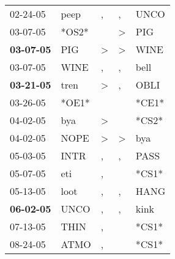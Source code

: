 \begin{supertabular}{p{0.07\textwidth}p{0.06\textwidth}p{0.02\textwidth}p{0.02\textwidth}p{0.06\textwidth}}
          02-24-05\textsuperscript{} &           peep\textsuperscript{} &                , &                , &           UNCO\textsuperscript{} \\
          03-07-05\textsuperscript{} &                            *OS2* &                  &     \textgreater &            PIG\textsuperscript{} \\
 \textbf{03-07-05\textsuperscript{}} &            PIG\textsuperscript{} &     \textgreater &     \textgreater &           WINE\textsuperscript{} \\
          03-07-05\textsuperscript{} &           WINE\textsuperscript{} &                , &                , &           bell\textsuperscript{} \\
 \textbf{03-21-05\textsuperscript{}} &           tren\textsuperscript{} &     \textgreater &                , &           OBLI\textsuperscript{} \\
          03-26-05\textsuperscript{} &                            *OE1* &                  &                  &                            *CE1* \\
          04-02-05\textsuperscript{} &            bya\textsuperscript{} &     \textgreater &                  &                            *CS2* \\
          04-02-05\textsuperscript{} &           NOPE\textsuperscript{} &     \textgreater &     \textgreater &            bya\textsuperscript{} \\
          05-03-05\textsuperscript{} &           INTR\textsuperscript{} &                , &                , &           PASS\textsuperscript{} \\
          05-07-05\textsuperscript{} &            eti\textsuperscript{} &                , &                  &                            *CS1* \\
          05-13-05\textsuperscript{} &           loot\textsuperscript{} &                , &                , &           HANG\textsuperscript{} \\
 \textbf{06-02-05\textsuperscript{}} &           UNCO\textsuperscript{} &                , &                , &           kink\textsuperscript{} \\
          07-13-05\textsuperscript{} &           THIN\textsuperscript{} &                , &                  &                            *CS1* \\
          08-24-05\textsuperscript{} &           ATMO\textsuperscript{} &                , &                  &                            *CS1* \\

\end{supertabular}
